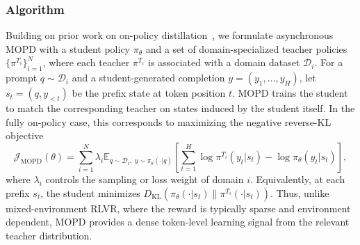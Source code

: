 
\subsubsection{Algorithm}

Building on prior work on on-policy distillation~\citep{yang2026nemotron,lu2025onpolicydistillation,xiao2026mimo}, we formulate asynchronous MOPD with a student policy $\pi_\theta$ and a set of domain-specialized teacher policies $\{\pi^{T_i}\}_{i=1}^{N}$, where each teacher $\pi^{T_i}$ is associated with a domain dataset $\mathcal{D}_i$. For a prompt $q \sim \mathcal{D}_i$ and a
student-generated completion $y=(y_1,\ldots,y_H)$, let
$s_t=(q,y_{<t})$ be the prefix state at token position $t$. MOPD trains the
student to match the corresponding teacher on states induced by the student
itself. In the fully on-policy case, this corresponds to maximizing the
negative reverse-KL objective
\begin{equation}
\mathcal{J}_{\mathrm{MOPD}}(\theta)
=
\sum_{i=1}^{N} \lambda_i
\mathbb{E}_{q \sim \mathcal{D}_i,\; y \sim \pi_\theta(\cdot|q)}
\left[
\sum_{t=1}^{H}
\log \pi^{T_i}(y_t|s_t)
-
\log \pi_\theta(y_t|s_t)
\right],
\label{eq:mopd_reverse_kl}
\end{equation}
where $\lambda_i$ controls the sampling or loss weight of domain $i$. Equivalently,
at each prefix $s_t$, the student minimizes
$D_{\mathrm{KL}}(\pi_\theta(\cdot|s_t)\|\pi^{T_i}(\cdot|s_t))$. Thus, unlike
mixed-environment RLVR, where the reward is typically sparse and environment
dependent, MOPD provides a dense token-level learning signal from the relevant
teacher distribution.

